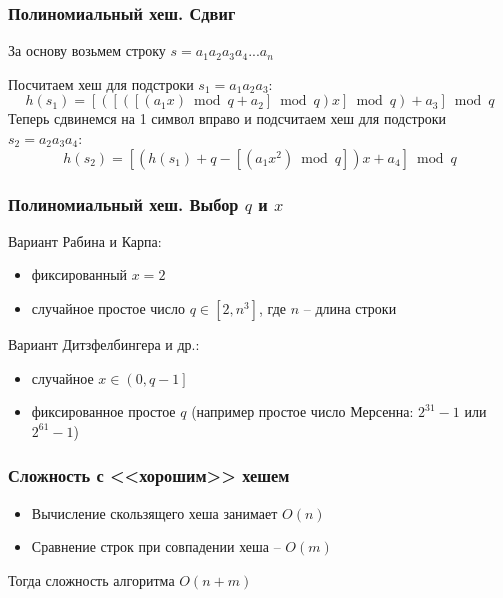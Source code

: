\documentclass[aspectratio=169]{beamer}
\begin{document}
\begin{frame}
    \frametitle{Полиномиальный хеш. Сдвиг}
    За основу возьмем строку $s=a_1a_2a_3a_4...a_n$

    Посчитаем хеш для подстроки $s_1 = a_1a_2a_3$:
    \[h(s_1) = \left[\left(\left[\left(\left[\left(a_1 x\right) \bmod{q} + a_2\right] \bmod{q}\right) x \right] \bmod{q}\right) + a_3\right] \bmod{q}\]
    Теперь сдвинемся на 1 символ вправо и подсчитаем хеш для подстроки $s_2 = a_2a_3a_4$:
    \[h(s_2) = \left[\left(h(s_1) + q - \left[\left(a_1 x^2\right)\bmod{q} \right] \right)x + a_4\right] \bmod{q}\]
\end{frame}

\begin{frame}
    \frametitle{Полиномиальный хеш. Выбор $q$ и $x$}
    Вариант Рабина и Карпа:
    \begin{itemize}
        \item фиксированный $x=2$
        \item случайное простое число $q \in \left[2, n^3\right]$, где $n$ -- длина строки
    \end{itemize}

    Вариант Дитзфелбингера и др.:
    \begin{itemize}
        \item случайное $x \in \left(0, q-1\right]$
        \item фиксированное простое $q$ (например простое число Мерсенна: $2^{31}-1$ или $2^{61} -1$)
    \end{itemize}
\end{frame}


\begin{frame}
    \frametitle{Сложность с <<хорошим>> хешем}
    \begin{itemize}
        \item Вычисление скользящего хеша занимает $O(n)$
        \item Сравнение строк при совпадении хеша -- $O(m)$
    \end{itemize}
    Тогда сложность алгоритма $O(n+m)$
\end{frame}
\end{document}
